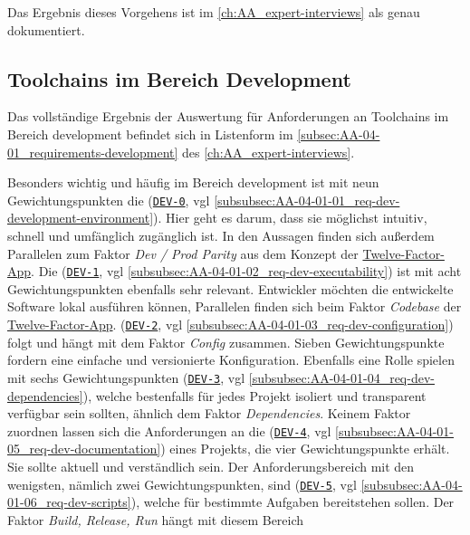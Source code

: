 Das Ergebnis dieses Vorgehens ist im \autoref{ch:AA_expert-interviews} als  genau dokumentiert.

\subsection{Toolchains im Bereich Development}
\label{subsec:04-02-02_toolchains-in-development}

Das vollständige Ergebnis der Auswertung für Anforderungen an Toolchains im Bereich \Gls{development} befindet sich in Listenform im \autoref{subsec:AA-04-01_requirements-development} des \autoref{ch:AA_expert-interviews}.

Besonders wichtig und häufig im Bereich \Gls{development} ist mit neun Gewichtungspunkten die \textbf{} (\hyperref[subsubsec:AA-04-01-01_req-dev-development-environment]{\texttt{DEV-0}}, \acrshort{vgl} \autoref{subsubsec:AA-04-01-01_req-dev-development-environment}). Hier geht es darum, dass sie möglichst intuitiv, schnell und umfänglich zugänglich ist. In den Aussagen finden sich außerdem Parallelen zum Faktor \textit{Dev / Prod Parity} aus dem Konzept der \hyperref[sec:03-05_concept-of-twelve-factor-app]{Twelve-Factor-App}. Die \textbf{} (\hyperref[subsubsec:AA-04-01-02_req-dev-executability]{\texttt{DEV-1}}, \acrshort{vgl} \autoref{subsubsec:AA-04-01-02_req-dev-executability}) ist mit acht Gewichtungspunkten ebenfalls sehr relevant. Entwickler möchten die entwickelte Software lokal ausführen können, Parallelen finden sich beim Faktor \textit{Codebase} der \hyperref[sec:03-05_concept-of-twelve-factor-app]{Twelve-Factor-App}. \textbf{} (\hyperref[subsubsec:AA-04-01-03_req-dev-configuration]{\texttt{DEV-2}}, \acrshort{vgl} \autoref{subsubsec:AA-04-01-03_req-dev-configuration}) folgt und hängt mit dem Faktor \textit{Config} zusammen. Sieben Gewichtungspunkte fordern eine einfache und versionierte Konfiguration. Ebenfalls eine Rolle spielen mit sechs Gewichtungspunkten \textbf{} (\hyperref[subsubsec:AA-04-01-04_req-dev-dependencies]{\texttt{DEV-3}}, \acrshort{vgl} \autoref{subsubsec:AA-04-01-04_req-dev-dependencies}), welche bestenfalls für jedes Projekt isoliert und transparent verfügbar sein sollten, ähnlich dem Faktor \textit{Dependencies}. Keinem Faktor zuordnen lassen sich die Anforderungen an die \textbf{} (\hyperref[subsubsec:AA-04-01-05_req-dev-documentation]{\texttt{DEV-4}}, \acrshort{vgl} \autoref{subsubsec:AA-04-01-05_req-dev-documentation}) eines Projekts, die vier Gewichtungspunkte erhält. Sie sollte aktuell und verständlich sein. Der Anforderungsbereich mit den wenigsten, nämlich zwei Gewichtungspunkten, sind \textbf{} (\hyperref[subsubsec:AA-04-01-06_req-dev-scripts]{\texttt{DEV-5}}, \acrshort{vgl} \autoref{subsubsec:AA-04-01-06_req-dev-scripts}), welche für bestimmte Aufgaben bereitstehen sollen. Der Faktor \textit{Build, Release, Run} hängt mit diesem Bereich 